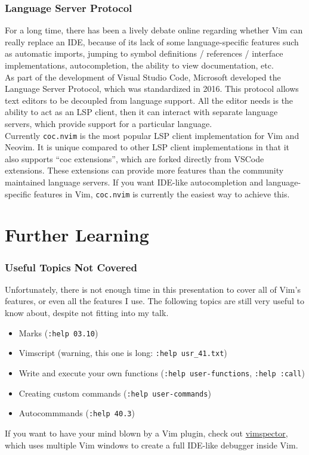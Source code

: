 \documentclass{beamer}
\begin{document}
\begin{frame}[fragile]
    \frametitle{Language Server Protocol}
    \small
    For a long time, there has been a lively debate online regarding whether Vim can really replace an IDE, because of its lack of some language-specific features such as automatic imports, jumping to symbol definitions / references / interface implementations, autocompletion, the ability to view documentation, etc.\\
    \vspace{0.5cm}
    As part of the development of Visual Studio Code, Microsoft developed the Language Server Protocol, which was standardized in 2016. This protocol allows text editors to be decoupled from language support. All the editor needs is the ability to act as an LSP client, then it can interact with separate language servers, which provide support for a particular language.\\
    \vspace{0.5cm}
    Currently \verb+coc.nvim+ is the most popular LSP client implementation for Vim and Neovim. It is unique compared to other LSP client implementations in that it also supports \enquote{coc extensions}, which are forked directly from VSCode extensions. These extensions can provide more features than the community maintained language servers. If you want IDE-like autocompletion and language-specific features in Vim, \verb+coc.nvim+ is currently the easiest way to achieve this.
\end{frame}

\section{Further Learning}

\begin{frame}[fragile]
    \frametitle{Useful Topics Not Covered}
    \small
    Unfortunately, there is not enough time in this presentation to cover all of Vim's features, or even all the features I use. The following topics are still very useful to know about, despite not fitting into my talk.
    \begin{itemize}
	\item Marks (\verb+:help 03.10+)
	\item Vimscript (warning, this one is long: \verb+:help usr_41.txt+)
	\item Write and execute your own functions (\verb+:help user-functions+, \verb+:help :call+)
	\item Creating custom commands (\verb+:help user-commands+)
	\item Autocommmands (\verb+:help 40.3+)
    \end{itemize}
    If you want to have your mind blown by a Vim plugin, check out \href{https://github.com/puremourning/vimspector}{vimspector}, which uses multiple Vim windows to create a full IDE-like debugger inside Vim.
\end{frame}
\end{document}
